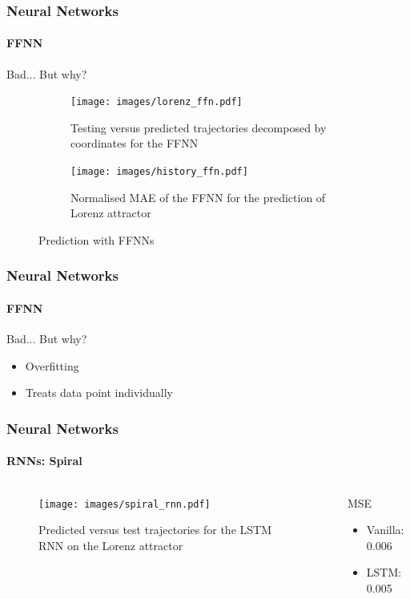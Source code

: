 \documentclass{beamer}
\begin{document}
\begin{frame}[t]
	\frametitle{Neural Networks}
	\framesubtitle{FFNN}
	{\color{red} Bad... } But why?

	\begin{figure}[ht]
		\centering
		\begin{subfigure}[b]{0.5\textwidth}
		\begin{center}
			\texttt{[image: images/lorenz\_ffn.pdf]}
		\end{center}
		\caption{Testing versus predicted trajectories decomposed by coordinates for the FFNN}
		\end{subfigure}
		\begin{subfigure}[b]{0.45\textwidth}
		      \centering
		      \texttt{[image: images/history\_ffn.pdf]}
		\caption{Normalised MAE of the FFNN for the prediction of Lorenz attractor}
		      \label{fig:history-ffn}
	    \end{subfigure}

		\caption{Prediction with FFNNs}
		\label{fig:ffnn}
	\end{figure}

	
\end{frame}

\begin{frame}[t]
	\frametitle{Neural Networks}
	\framesubtitle{FFNN}
	{\color{red} Bad...} But why?
	\begin{itemize}
		\item Overfitting
		\item Treats data point individually
	\end{itemize}
	
\end{frame}

\begin{frame}
  \frametitle{Neural Networks}
  \framesubtitle{RNNs: Spiral}
	\begin{columns}[T]
		
	\begin{column}{0.6\textwidth}
		
	\begin{figure}[ht]
		\centering
		      \centering
		      \texttt{[image: images/spiral\_rnn.pdf]}

		      \caption{Predicted versus test trajectories for the LSTM RNN on the Lorenz attractor}
		      \label{fig:spiral}

	\end{figure}
	\end{column}

	\begin{column}{0.35\textwidth}
		
	\begin{block}{MSE}
	\begin{itemize}
		\item Vanilla: 0.006
		\item LSTM: 0.005
	\end{itemize}
	\end{block}
	\end{column}

	\end{columns}
\end{frame}
\end{document}

